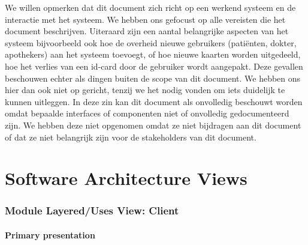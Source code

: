 \documentclass[a4paper,10pt]{article}
\begin{document}
We willen opmerken dat dit document zich richt op een werkend systeem en de interactie met het systeem.  We hebben ons gefocust op alle vereisten die het document beschrijven.  Uiteraard zijn een aantal belangrijke aspecten van het systeem bijvoorbeeld ook hoe de overheid nieuwe gebruikers (patiënten, dokter, apothekers) aan het systeem toevoegt, of hoe nieuwe kaarten worden uitgedeeld, hoe het verlies van een id-card door de gebruiker wordt aangepakt.  Deze gevallen beschouwen echter als dingen buiten de scope van dit document.  We hebben ons hier dan ook niet op gericht, tenzij we het nodig vonden om iets duidelijk te kunnen uitleggen. In deze zin kan dit document als onvolledig beschouwt worden omdat bepaalde interfaces of componenten niet of onvolledig gedocumenteerd zijn.  We hebben deze niet opgenomen omdat ze niet bijdragen aan dit document of dat ze niet belangrijk zijn voor de stakeholders van dit document.

\clearpage
\part{Software Architecture Views}
\setcounter{section}{0}

\clearpage
\section{Module Layered/Uses View: Client}

\subsection{Primary presentation}
\end{document}
